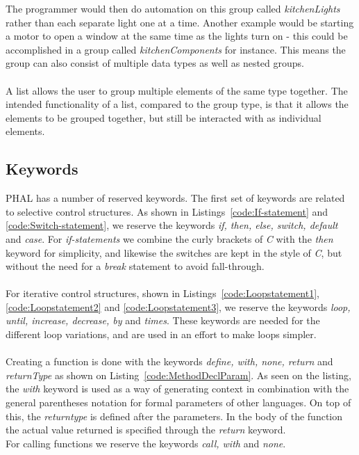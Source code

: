 The programmer would then do automation on this group called \textit{kitchenLights} rather than each separate light one at a time. 
Another example would be starting a motor to open a window at the same time as the lights turn on - this could be accomplished in a group called
\textit{kitchenComponents} for instance. 
This means the group can also consist of multiple data types as well as nested groups.
\\\\
A list allows the user to group multiple elements of the same type together. 
The intended functionality of a list, compared to the group type, is that it allows the elements to be grouped together, but still be interacted with as individual elements.

\subsection{Keywords}
PHAL has a number of reserved keywords. 
The first set of keywords are related to selective control structures. 
As shown in Listings~\ref{code:If-statement} and \ref{code:Switch-statement}, we reserve the keywords \textit{if, then, else, switch, default} and \textit{case}. 
For \textit{if-statements} we combine the curly brackets of \textit{C} with the \textit{then} keyword for simplicity, and likewise the switches are kept in the style of \textit{C}, but without the need for a \textit{break} statement to avoid fall-through.
\\\\
For iterative control structures, shown in Listings~\ref{code:Loopstatement1}, \ref{code:Loopstatement2} and \ref{code:Loopstatement3}, we reserve the keywords \textit{loop, until, increase, decrease, by} and \textit{times}. 
These keywords are needed for the different loop variations, and are used in an effort to make loops simpler.
\\\\
Creating a function is done with the keywords \textit{define, with, none, return} and \textit{returnType} as shown on Listing~\ref{code:MethodDeclParam}. 
As seen on the listing, the \textit{with} keyword is used as a way of generating context in combination with the general parentheses notation for formal parameters of other languages. 
On top of this, the \textit{returntype} is defined after the parameters. 
In the body of the function the actual value returned is specified through the \textit{return} keyword.
\\
For calling functions we reserve the keywords \textit{call, with} and \textit{none}. 
